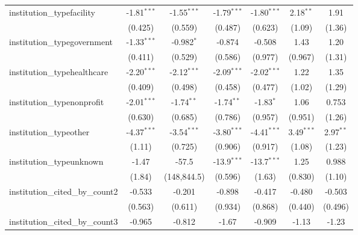 \begin{tabular}{lcccccc}
   institution\_typefacility             & -1.81$^{***}$ & -1.55$^{***}$ & -1.79$^{***}$ & -1.80$^{***}$ & 2.18$^{**}$   & 1.91\\   
                                         & (0.425)       & (0.559)       & (0.487)       & (0.623)       & (1.09)        & (1.36)\\   
   institution\_typegovernment           & -1.33$^{***}$ & -0.982$^{*}$  & -0.874        & -0.508        & 1.43          & 1.20\\   
                                         & (0.411)       & (0.529)       & (0.586)       & (0.977)       & (0.967)       & (1.31)\\   
   institution\_typehealthcare           & -2.20$^{***}$ & -2.12$^{***}$ & -2.09$^{***}$ & -2.02$^{***}$ & 1.22          & 1.35\\   
                                         & (0.409)       & (0.498)       & (0.458)       & (0.477)       & (1.02)        & (1.29)\\   
   institution\_typenonprofit            & -2.01$^{***}$ & -1.74$^{**}$  & -1.74$^{**}$  & -1.83$^{*}$   & 1.06          & 0.753\\   
                                         & (0.630)       & (0.685)       & (0.786)       & (0.957)       & (0.951)       & (1.26)\\   
   institution\_typeother                & -4.37$^{***}$ & -3.54$^{***}$ & -3.80$^{***}$ & -4.41$^{***}$ & 3.49$^{***}$  & 2.97$^{**}$\\   
                                         & (1.11)        & (0.725)       & (0.906)       & (0.917)       & (1.08)        & (1.23)\\   
   institution\_typeunknown              & -1.47         & -57.5         & -13.9$^{***}$ & -13.7$^{***}$ & 1.25          & 0.988\\   
                                         & (1.84)        & (148,844.5)   & (0.596)       & (1.63)        & (0.830)       & (1.10)\\   
   institution\_cited\_by\_count2        & -0.533        & -0.201        & -0.898        & -0.417        & -0.480        & -0.503\\   
                                         & (0.563)       & (0.611)       & (0.934)       & (0.868)       & (0.440)       & (0.496)\\   
   institution\_cited\_by\_count3        & -0.965        & -0.812        & -1.67         & -0.909        & -1.13         & -1.23\\   

\end{tabular}
